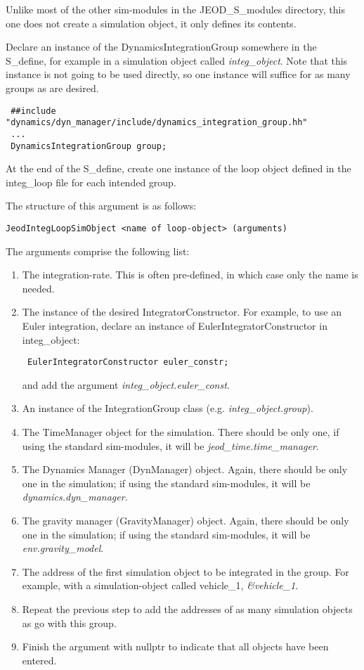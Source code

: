 Unlike most of the other sim-modules in the JEOD\_S\_modules directory, this
one
does not create a simulation object, it only defines its contents.

Declare an instance of the DynamicsIntegrationGroup somewhere in the
S\_define, for example in a simulation object called \textit{integ\_object}.  Note that this instance is not going to be used directly, so one instance will suffice for as many groups as are desired.
\begin{verbatim}
 ##include "dynamics/dyn_manager/include/dynamics_integration_group.hh"
 ...
 DynamicsIntegrationGroup group;
\end{verbatim}



At the end of the S\_define, create one instance of the loop object defined in
the integ\_loop file for each intended group.

The structure of this argument is as follows:
\begin{verbatim}
JeodIntegLoopSimObject <name of loop-object> (arguments)
\end{verbatim}

The arguments comprise the following list:
\begin{enumerate}
 \item  The integration-rate.  This is often pre-defined, in which case only
 the name is needed.
 \item  The instance of the desired IntegratorConstructor.  For example, to
 use an Euler integration, declare an instance of EulerIntegratorConstructor
 in integ\_object:
 \begin{verbatim}
 EulerIntegratorConstructor euler_constr;
  \end{verbatim}
  and add the argument \textit{integ\_object.euler\_const}.
  \item An instance of the IntegrationGroup class (e.g.
  \textit{integ\_object.group}).

  \item The TimeManager object for the simulation.  There should be only one,
  if using the standard sim-modules, it will be
  \textit{jeod\_time.time\_manager}.
  \item The Dynamics Manager (DynManager) object.  Again, there should be only
  one in the simulation; if using the standard sim-modules, it will be
  \textit{dynamics.dyn\_manager}.

  \item The gravity manager (GravityManager) object.  Again, there should be only
  one in the simulation; if using the standard sim-modules, it will be
  \textit{env.gravity\_model}.
  \item The address of the first simulation object to be integrated in the
  group.  For example, with a simulation-object called vehicle\_1,
  \textit{\&vehicle\_1}.
  \item Repeat the previous step to add the addresses of as many simulation
  objects as go with this group.
  \item Finish the argument with nullptr to indicate that all objects have been
  entered.
\end{enumerate}

